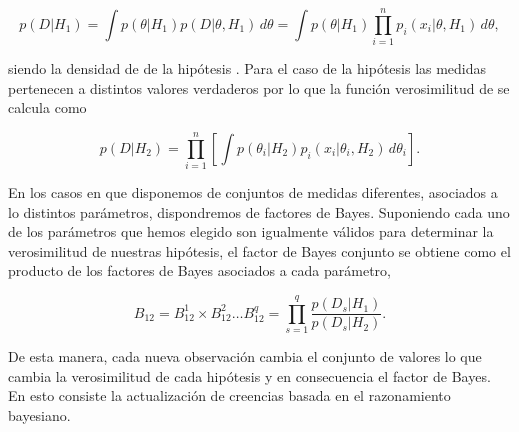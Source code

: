 \begin{equation}
    p(D|H_1)=\int p(\theta|H_1)p(D|\theta,H_1)\,d\theta=\int p(\theta|H_1)\prod_{i=1}^{n}p_i(x_i|\theta,H_1)\,d\theta,
\end{equation}

siendo  la densidad de  de la hipótesis . Para el caso de la hipótesis  las medidas  pertenecen a distintos valores verdaderos  por lo que la función verosimilitud de  se calcula como

\begin{equation}
    p(D|H_2)=\prod_{i=1}^{n}\left[\int p({\theta}_i|H_2)p_i(x_i|{\theta}_i,H_2)\,d\theta_i \right].
\end{equation}

En los casos en que disponemos de  conjuntos de medidas  diferentes, asociados a lo distintos parámetros, dispondremos de  factores de Bayes. Suponiendo cada uno de los parámetros que hemos elegido son igualmente válidos para determinar la verosimilitud de nuestras hipótesis, el factor de Bayes conjunto se obtiene como el producto de los factores de Bayes asociados a cada parámetro,

\begin{equation}\label{eq:bayes_multiple}
    B_{12}=B^{1}_{12}\times B^{2}_{12} \dots B^{q}_{12}=\prod_{s=1}^{q}\frac{p(D_{s}|H_1)}{p(D_{s}|H_2)}.
\end{equation}

De esta manera, cada nueva observación cambia el conjunto de valores  lo que cambia la verosimilitud de cada hipótesis y en consecuencia el factor de Bayes. En esto consiste la actualización de creencias basada en el razonamiento bayesiano.